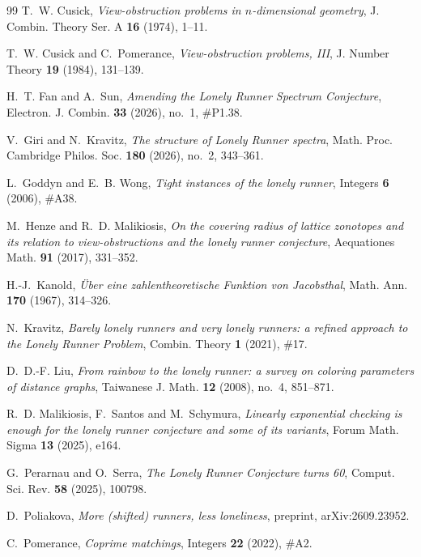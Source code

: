 \documentclass[11pt]{article}
\theoremstyle{definition}
\begin{document}
\begin{thebibliography}{99}
T.~W. Cusick, \emph{View-obstruction problems in $n$-dimensional
geometry}, J. Combin. Theory Ser. A \textbf{16} (1974), 1--11.

T.~W. Cusick and C.~Pomerance, \emph{View-obstruction problems, III},
J. Number Theory \textbf{19} (1984), 131--139.

H.~T. Fan and A.~Sun, \emph{Amending the Lonely Runner Spectrum
Conjecture}, Electron. J. Combin. \textbf{33} (2026), no.~1, \#P1.38.

V.~Giri and N.~Kravitz, \emph{The structure of Lonely Runner spectra},
Math. Proc. Cambridge Philos. Soc. \textbf{180} (2026), no.~2,
343--361.

L.~Goddyn and E.~B. Wong, \emph{Tight instances of the lonely runner},
Integers \textbf{6} (2006), \#A38.

M.~Henze and R.~D. Malikiosis, \emph{On the covering radius of lattice
zonotopes and its relation to view-obstructions and the lonely runner
conjecture}, Aequationes Math. \textbf{91} (2017), 331--352.

H.-J.~Kanold, \emph{\"Uber eine zahlentheoretische Funktion von
Jacobsthal}, Math. Ann. \textbf{170} (1967), 314--326.

N.~Kravitz, \emph{Barely lonely runners and very lonely runners: a
refined approach to the Lonely Runner Problem}, Combin. Theory
\textbf{1} (2021), \#17.

D.~D.-F. Liu, \emph{From rainbow to the lonely runner: a survey on
coloring parameters of distance graphs}, Taiwanese J. Math. \textbf{12}
(2008), no.~4, 851--871.

R.~D. Malikiosis, F.~Santos and M.~Schymura, \emph{Linearly exponential
checking is enough for the lonely runner conjecture and some of its
variants}, Forum Math. Sigma \textbf{13} (2025), e164.

G.~Perarnau and O.~Serra, \emph{The Lonely Runner Conjecture turns 60},
Comput. Sci. Rev. \textbf{58} (2025), 100798.

D.~Poliakova, \emph{More (shifted) runners, less loneliness}, preprint,
arXiv:2609.23952.

C.~Pomerance, \emph{Coprime matchings}, Integers \textbf{22} (2022),
\#A2.


\end{thebibliography}
\end{document}
